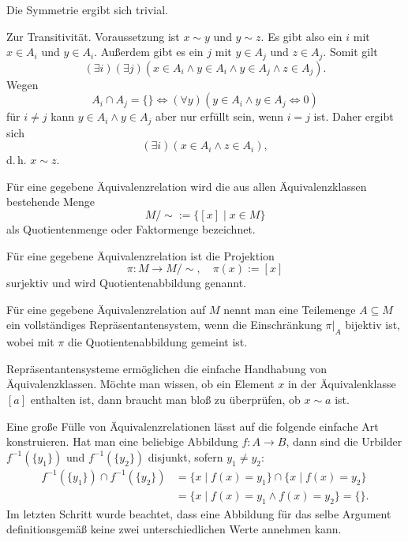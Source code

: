Die Symmetrie ergibt sich trivial.

Zur Transitivität. Voraussetzung ist $x\sim y$ und $y\sim z$.
Es gibt also ein $i$ mit $x\in A_i$ und $y\in A_i$. Außerdem gibt
es ein $j$ mit $y\in A_j$ und $z\in A_j$. Somit gilt%
\[(\exists i)(\exists j)(x\in A_i\land y\in A_i\land y\in A_j\land z\in A_j).\]
Wegen
\[A_i\cap A_j = \{\} \iff (\forall y)(y\in A_i\land y\in A_j\iff 0)\]
für $i\ne j$ kann $y\in A_i\land y\in A_j$ aber nur erfüllt sein,
wenn $i=j$ ist. Daher ergibt sich%
\[(\exists i)(x\in A_i\land z\in A_i),\]
d.\,h. $x\sim z$.\;\qedsymbol

\begin{Definition}[Quotientenmenge]
Für eine gegebene Äquivalenzrelation wird die aus allen
Äquivalenzklassen bestehende Menge
\[M/{\sim} := \{[x]\mid x\in M\}\]
als Quotientenmenge oder Faktormenge bezeichnet.
\end{Definition}

\begin{Definition}[Quotientenabbildung]
Für eine gegebene Äquivalenzrelation ist die Projektion
\[\pi\colon M\to M/{\sim},\quad \pi(x):=[x]\]
surjektiv und wird Quotientenabbildung genannt.
\end{Definition}

\newpage
\begin{Definition}[Repräsentantensystem]
Für eine gegebene Äquivalenzrelation auf $M$ nennt man eine
Teilemenge $A\subseteq M$ ein vollständiges Repräsentantensystem,
wenn die Einschränkung $\pi|_A$ bijektiv ist, wobei mit $\pi$
die Quotientenabbildung gemeint ist.
\end{Definition}
Repräsentantensysteme ermöglichen die einfache Handhabung von
Äquivalenzklassen. Möchte man wissen, ob ein Element $x$ in der
Äquivalenklasse $[a]$ enthalten ist, dann braucht man bloß
zu überprüfen, ob $x\sim a$ ist.

Eine große Fülle von Äquivalenzrelationen lässt auf die folgende
einfache Art konstruieren. Hat man eine beliebige Abbildung
$f\colon A\to B$, dann sind die Urbilder $f^{-1}(\{y_1\})$ und
$f^{-1}(\{y_2\})$ disjunkt, sofern $y_1\ne y_2$:%
\begin{align*}
f^{-1}(\{y_1\})\cap f^{-1}(\{y_2\})
&= \{x\mid f(x)=y_1\}\cap\{x\mid f(x)=y_2\}\\
&= \{x\mid f(x)=y_1\land f(x)=y_2\} = \{\}.
\end{align*}
Im letzten Schritt wurde beachtet, dass eine Abbildung für
das selbe Argument definitionsgemäß keine zwei unterschiedlichen
Werte annehmen kann.

